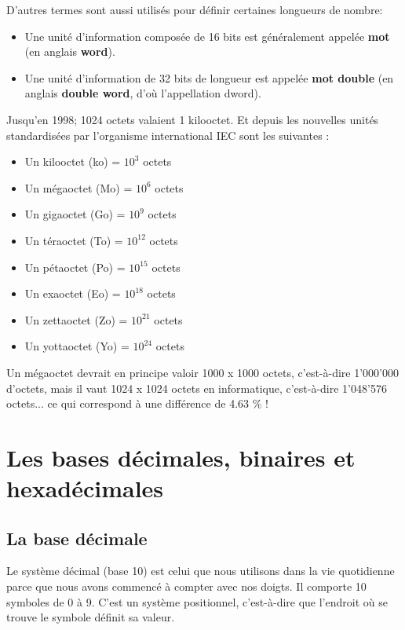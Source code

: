 \documentclass[11pt, a4paper]{book}
\begin{document}
D'autres termes sont aussi utilisés pour définir certaines longueurs de nombre:
\begin{itemize}
\item Une unité d'information composée de 16 bits est généralement appelée {\bf mot} (en anglais {\bf word}).

\item Une unité d'information de 32 bits de longueur est appelée {\bf mot double} (en anglais {\bf double word}, d'où l'appellation dword).
\end{itemize}

Jusqu'en 1998; 1024 octets valaient 1 kilooctet. Et depuis les nouvelles unités standardisées par l'organisme international IEC sont les suivantes :
\begin{itemize}
\item Un kilooctet (ko) = $10^3$ octets
\item Un mégaoctet (Mo) = $10^6$ octets
\item Un gigaoctet (Go) = $10^9$ octets
\item Un téraoctet (To) = $10^{12}$ octets
\item Un pétaoctet (Po) = $10^{15}$ octets
\item Un exaoctet (Eo) = $10^{18}$ octets
\item Un zettaoctet (Zo) = $10^{21}$ octets
\item Un yottaoctet (Yo) = $10^{24}$ octets
\end{itemize}

\begin{remarque}
Un mégaoctet devrait en principe valoir 1000 x 1000 octets, c'est-à-dire 1'000'000 d'octets, mais il vaut 1024 x 1024 octets en informatique, c'est-à-dire 1'048'576 octets... ce qui correspond à une différence de 4.63 \% !
\end{remarque}

\section{Les bases décimales, binaires et hexadécimales}


\subsection{La base décimale}

Le système décimal (base 10) est celui que nous utilisons dans la vie quotidienne parce que nous avons commencé à compter avec nos doigts. Il comporte 10 symboles de 0 à 9. C'est un système positionnel, c'est-à-dire que l'endroit où se trouve le symbole définit sa valeur.
\end{document}
